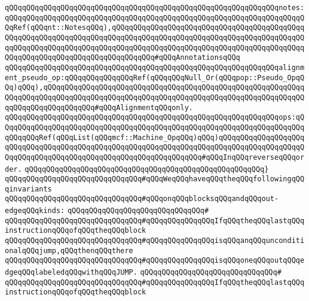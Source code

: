 \verb|qQQqqQQqqQQqqQQqqQQqqQQqqQQqqQQqqQQqqQQqqQQqqQQqqQQqqQQqqQQqqQQqnotes:qQQqqQQqqQQqqQQqqQQqqQQqqQQqqQQqqQQqqQQqqQQqqQQqqQQqqQQqqQQqqQQqqQQqqQQqRef(qQQqnt::NotesqQQq),qQQqqQQqqQQqqQQqqQQqqQQqqQQqqQQqqQQqqQQqqQQqqQQqqQQqqQQqqQQqqQQqqQQqqQQqqQQqqQQqqQQqqQQqqQQqqQQqqQQqqQQqqQQqqQQqqQQqqQQqqQQqqQQqqQQqqQQqqQQqqQQqqQQqqQQqqQQqqQQqqQQqqQQqqQQqqQQqqQQqqQQqqQQqqQQqqQQqqQQqqQQqqQQqqQQqqQQqqQQq#qQQqAnnotationsqQQq|\newline
\newline
\verb|qQQqqQQqqQQqqQQqqQQqqQQqqQQqqQQqqQQqqQQqqQQqqQQqqQQqqQQqqQQqqQQqalignment_pseudo_op:qQQqqQQqqQQqqQQqRef(qQQqqQQqNull_Or(qQQqpop::Pseudo_OpqQQq)qQQq),qQQqqQQqqQQqqQQqqQQqqQQqqQQqqQQqqQQqqQQqqQQqqQQqqQQqqQQqqQQqqQQqqQQqqQQqqQQqqQQqqQQqqQQqqQQqqQQqqQQqqQQqqQQqqQQqqQQqqQQqqQQqqQQqqQQqqQQqqQQqqQQqqQQqqQQq#qQQqAlignmentqQQqonly.|\newline
\newline
\newline
\verb|qQQqqQQqqQQqqQQqqQQqqQQqqQQqqQQqqQQqqQQqqQQqqQQqqQQqqQQqqQQqqQQqops:qQQqqQQqqQQqqQQqqQQqqQQqqQQqqQQqqQQqqQQqqQQqqQQqqQQqqQQqqQQqqQQqqQQqqQQqqQQqqQQqRef(qQQqList(qQQqmcf::Machine_OpqQQq)qQQq)qQQqqQQqqQQqqQQqqQQqqQQqqQQqqQQqqQQqqQQqqQQqqQQqqQQqqQQqqQQqqQQqqQQqqQQqqQQqqQQqqQQqqQQqqQQqqQQqqQQqqQQqqQQqqQQqqQQqqQQqqQQqqQQqqQQqqQQq#qQQqInqQQqreverseqQQqorder.|\newline
\verb|qQQqqQQqqQQqqQQqqQQqqQQqqQQqqQQqqQQqqQQqqQQqqQQqqQQqqQQq}|\newline
\newline
\newline
\verb|qQQqqQQqqQQqqQQqqQQqqQQqqQQqqQQq#qQQqWeqQQqhaveqQQqtheqQQqfollowingqQQqinvariants|\newline
\verb|qQQqqQQqqQQqqQQqqQQqqQQqqQQqqQQq#qQQqonqQQqblocksqQQqandqQQqout-edgeqQQqkinds:|\newline
\verb|qQQqqQQqqQQqqQQqqQQqqQQqqQQqqQQq#|\newline
\verb|qQQqqQQqqQQqqQQqqQQqqQQqqQQqqQQq#qQQqqQQqqQQqqQQqIfqQQqtheqQQqlastqQQqinstructionqQQqofqQQqtheqQQqblock|\newline
\verb|qQQqqQQqqQQqqQQqqQQqqQQqqQQqqQQq#qQQqqQQqqQQqqQQqisqQQqanqQQqunconditionalqQQqjump,qQQqthenqQQqthere|\newline
\verb|qQQqqQQqqQQqqQQqqQQqqQQqqQQqqQQq#qQQqqQQqqQQqqQQqisqQQqoneqQQqoutqQQqedgeqQQqlabeledqQQqwithqQQqJUMP.|\newline
\verb|qQQqqQQqqQQqqQQqqQQqqQQqqQQqqQQq#|\newline
\verb|qQQqqQQqqQQqqQQqqQQqqQQqqQQqqQQq#qQQqqQQqqQQqqQQqIfqQQqtheqQQqlastqQQqinstructionqQQqofqQQqtheqQQqblock|\newline
